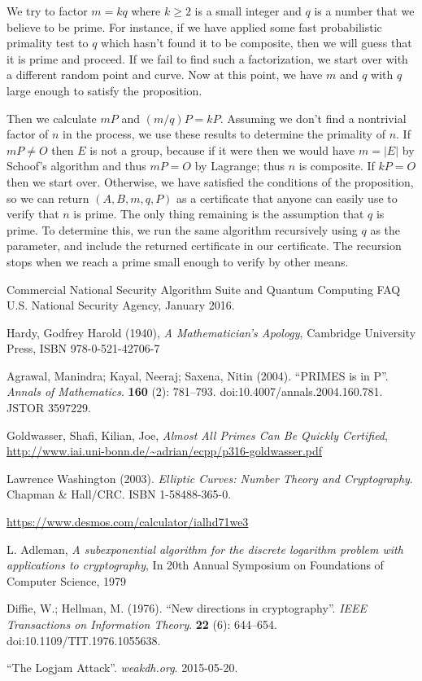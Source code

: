 \documentclass[12pt]{article}
\newcommand*\card[2][]{#1\lvert #2 #1\rvert}
\begin{document}
We try to factor $m = kq$ where $k \geq 2$ is a small integer and $q$ is a
number that we believe to be prime. For instance, if we have applied some fast
probabilistic primality test to $q$ which hasn't found it to be composite, then
we will guess that it is prime and proceed. If we fail to find such a
factorization, we start over with a different random point and curve. Now at
this point, we have $m$ and $q$ with $q$ large enough to satisfy the
proposition.

Then we calculate $mP$ and $(m/q)P = kP$. Assuming we don't find a nontrivial
factor of $n$ in the process, we use these results to determine the primality of
$n$. If $mP \neq O$ then $E$ is not a group, because if it were then we would
have $m = \card{E}$ by Schoof's algorithm and thus $mP = O$ by Lagrange; thus
$n$ is composite. If $kP = O$ then we start over. Otherwise, we have satisfied
the conditions of the proposition, so we can return $(A, B, m, q, P)$ as a
certificate that anyone can easily use to verify that $n$ is prime. The only
thing remaining is the assumption that $q$ is prime. To determine this, we run
the same algorithm recursively using $q$ as the parameter, and include the
returned certificate in our certificate. The recursion stops when we reach a
prime small enough to verify by other means.

\clearpage
\begin{thebibliography}{9}
Commercial National Security Algorithm Suite and Quantum Computing FAQ U.S.
National Security Agency, January 2016.

Hardy, Godfrey Harold (1940), \textit{A Mathematician's Apology}, Cambridge
University Press, ISBN 978-0-521-42706-7

Agrawal, Manindra; Kayal, Neeraj; Saxena, Nitin (2004). ``PRIMES is in P''.
\textit{Annals of Mathematics}. \textbf{160} (2): 781–793.
doi:10.4007/annals.2004.160.781. JSTOR 3597229.

Goldwasser, Shafi, Kilian, Joe, \textit{Almost All Primes Can Be Quickly
Certified}, \url{http://www.iai.uni-bonn.de/~adrian/ecpp/p316-goldwasser.pdf}

Lawrence Washington (2003). \textit{Elliptic Curves: Number Theory and
Cryptography}. Chapman \& Hall/CRC. ISBN 1-58488-365-0.

\url{https://www.desmos.com/calculator/ialhd71we3}

L. Adleman, \textit{A subexponential algorithm for the discrete logarithm
problem with applications to cryptography}, In 20th Annual Symposium on
Foundations of Computer Science, 1979

Diffie, W.; Hellman, M. (1976). ``New directions in cryptography''. \textit{IEEE
Transactions on Information Theory}. \textbf{22} (6): 644–654.
doi:10.1109/TIT.1976.1055638.

``The Logjam Attack''. \textit{weakdh.org}. 2015-05-20.
\end{thebibliography}
\end{document}
